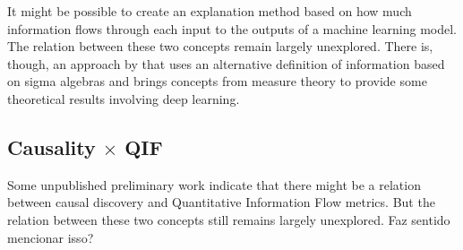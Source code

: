 It might be possible to create an explanation method based on how much information flows through each input to the outputs of a machine learning model. The relation between these two concepts remain largely unexplored. There is, though, an approach by \cite{Information Representation, chapter of Deep Learning Architectures A Mathematical Approach} that uses an alternative definition of information based on sigma algebras and brings concepts from measure theory to provide some theoretical results involving deep learning.

\subsection{Causality $\times$ QIF}

Some unpublished preliminary work indicate that there might be a relation between causal discovery and Quantitative Information Flow metrics. But the relation between these two concepts still remains largely unexplored. {\color{orange} Faz sentido mencionar isso?}
